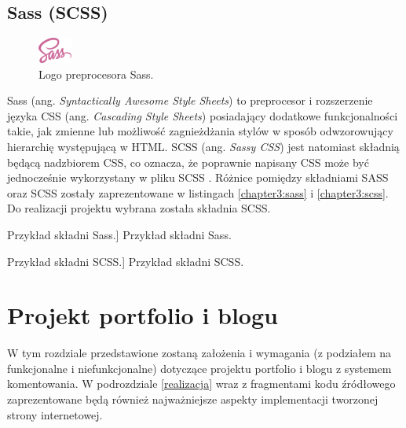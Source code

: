 \documentclass[12pt]{article}
\numberwithin{figure}{section}
\begin{document}
\begin{sloppypar}

\subsection*{Sass (SCSS)}

\begin{figure}[H] 
    \centering
        \includegraphics[width=0.1\textwidth]{images/sass-logo.png}
   \caption{Logo preprocesora Sass.}
\end{figure}

Sass (ang. \textit{Syntactically Awesome Style Sheets}) to preprocesor i rozszerzenie języka CSS (ang. \textit{Cascading Style Sheets}) posiadający dodatkowe funkcjonalności takie, jak zmienne lub możliwość zagnieżdżania stylów w sposób odwzorowujący hierarchię występującą w HTML. SCSS (ang. \textit{Sassy CSS}) jest natomiast składnią będącą nadzbiorem CSS, co oznacza, że poprawnie napisany CSS może być jednocześnie wykorzystany w pliku SCSS \cite{sass}. Różnice pomiędzy składniami SASS oraz SCSS zostały zaprezentowane w \linebreak listingach \ref{chapter3:sass} i \ref{chapter3:scss}. Do realizacji projektu wybrana została składnia SCSS.\newline
\begin{code}[htbp]
    
    \caption
    [Przykład składni Sass.]
    {Przykład składni Sass.}
    \label{chapter3:sass}
\end{code}

\newpage 

\begin{code}[htbp]
    
    \caption
    [Przykład składni SCSS.]
    {Przykład składni SCSS.}
    \label{chapter3:scss}
\end{code}


\clearpage

\section{Projekt portfolio i blogu} \label{wymagania}
W tym rozdziale przedstawione zostaną założenia i wymagania (z podziałem na funkcjonalne i niefunkcjonalne) dotyczące projektu portfolio i blogu z systemem komentowania. W podrozdziale \ref{realizacja} wraz z fragmentami kodu źródłowego zaprezentowane będą również najważniejsze aspekty implementacji tworzonej strony internetowej.
 

\end{sloppypar}
\end{document}

